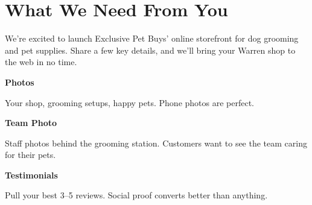 \documentclass[11pt,letterpaper]{article}
\begin{document}
\vspace{0.2em}

\section*{What We Need From You}

We’re excited to launch Exclusive Pet Buys’ online storefront for dog grooming and pet supplies. Share a few key details, and we’ll bring your Warren shop to the web in no time.

\vspace{0.12em}

\noindent\begin{minipage}[t]{0.48\textwidth}
\begin{tcolorbox}[colframe=accent-teal, boxrule=1pt, left=0.7em, right=0.7em, top=0.5em, bottom=0.5em, arc=4pt, boxsep=0pt]
{\bfseries\small\color{accent-teal}Photos}

\vspace{0.15em}

{\small Your shop, grooming setups, happy pets. Phone photos are perfect.}
\end{tcolorbox}

\vspace{0.1em}

\begin{tcolorbox}[colframe=accent-teal, boxrule=1pt, left=0.7em, right=0.7em, top=0.5em, bottom=0.5em, arc=4pt, boxsep=0pt]
{\bfseries\small\color{accent-teal}Team Photo}

\vspace{0.15em}

{\small Staff photos behind the grooming station. Customers want to see the team caring for their pets.}
\end{tcolorbox}

\vspace{0.1em}

\begin{tcolorbox}[colframe=accent-teal, boxrule=1pt, left=0.7em, right=0.7em, top=0.5em, bottom=0.5em, arc=4pt, boxsep=0pt]
{\bfseries\small\color{accent-teal}Testimonials}

\vspace{0.15em}

{\small Pull your best 3--5 reviews. Social proof converts better than anything.}
\end{tcolorbox}
\end{minipage}
\hfill
\end{document}
